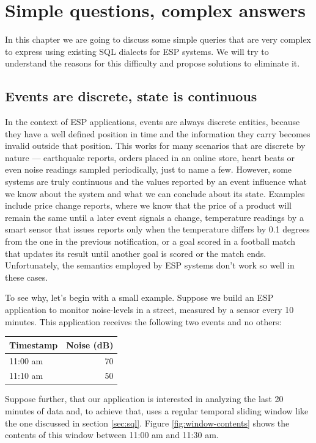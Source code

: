 \chapter{Simple questions, complex answers}
\label{chap:simple-questions-complex-answers}

In this chapter we are going to discuss some simple queries that are
very complex to express using existing SQL dialects for ESP
systems. We will try to understand the reasons for this difficulty and
propose solutions to eliminate it.

\section{Events are discrete, state is continuous}
\label{sec:acme-problem}

In the context of ESP applications, events are always discrete
entities, because they have a well defined position in time and the
information they carry becomes invalid outside that position. This
works for many scenarios that are discrete by nature --- earthquake
reports, orders placed in an online store, heart beats or even noise
readings sampled periodically, just to name a few. However, some
systems are truly continuous and the values reported by an event
influence what we know about the system and what we can conclude about
its state. Examples include price change reports, where we know that
the price of a product will remain the same until a later event
signals a change, temperature readings by a smart sensor that issues
reports only when the temperature differs by 0.1 degrees from the one
in the previous notification, or a goal scored in a football match
that updates its result until another goal is scored or the match
ends. Unfortunately, the semantics employed by ESP systems don't work
so well in these cases.

To see why, let's begin with a small example. Suppose we build an ESP
application to monitor noise-levels in a street, measured by a sensor
every 10 minutes. This application receives the following two events
and no others:

\begin{tabular}{ |l|r| }
  \hline
  Timestamp & Noise (dB) \\
  \hline
  11:00 am & 70 \\
  11:10 am & 50 \\
  \hline
\end{tabular}

Suppose further, that our application is interested in analyzing the
last 20 minutes of data and, to achieve that, uses a regular temporal
sliding window like the one discussed in section \ref{sec:sql}. Figure
\ref{fig:window-contents} shows the contents of this window between
11:00 am and 11:30 am.

